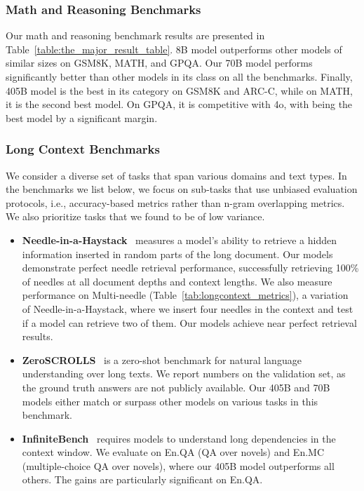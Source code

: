 \documentclass[dvipsnames]{fairmeta}
\begin{document}
\subsubsection{Math and Reasoning Benchmarks}
\label{subsubsec:reasoning_evals}

Our math and reasoning benchmark results are presented in Table~\ref{table:the_major_result_table}. \llamathree 8B model outperforms other models of similar sizes on GSM8K, MATH, and GPQA. Our 70B model performs significantly better than other models in its class on all the benchmarks. Finally, \llamathree 405B model is the best in its category on GSM8K and ARC-C, while on MATH, it is the second best model. On GPQA, it is competitive with \gpt4o, with \sonnet being the best model by a significant margin.

\subsubsection{Long Context Benchmarks}
\label{subsubsec:long_context_evals}

We consider a diverse set of tasks that span various domains and text types. In the benchmarks we list below, we focus on sub-tasks that use unbiased evaluation protocols, i.e., accuracy-based metrics rather than n-gram overlapping metrics. We also prioritize tasks that we found to be of low variance.  
\begin{itemize}
    \item \textbf{Needle-in-a-Haystack}~\citep{niah}
    measures a model’s ability to retrieve a hidden information inserted in random parts of the long document. Our \llamathree models demonstrate perfect needle retrieval performance, successfully retrieving 100\% of needles at all document depths and context lengths. We also measure performance on Multi-needle (Table~\ref{tab:longcontext_metrics}), a variation of Needle-in-a-Haystack, where we insert four needles in the context and test if a model can retrieve two of them. Our \llamathree models achieve near perfect retrieval results.
    \item \textbf{ZeroSCROLLS}~\citep{zeroscrolls} is a zero-shot benchmark for natural language understanding over long texts. We report numbers on the validation set, as the ground truth answers are not publicly available. Our \llamathree 405B and 70B models either match or surpass other models on various tasks in this benchmark.
    \item \textbf{InfiniteBench}~\citep{zhang2024infty} requires models to understand long dependencies in the context window. We evaluate \llamathree on En.QA (QA over novels) and En.MC (multiple-choice QA over novels), where our 405B model outperforms all others. The gains are particularly significant on En.QA.
\end{itemize}
\end{document}
